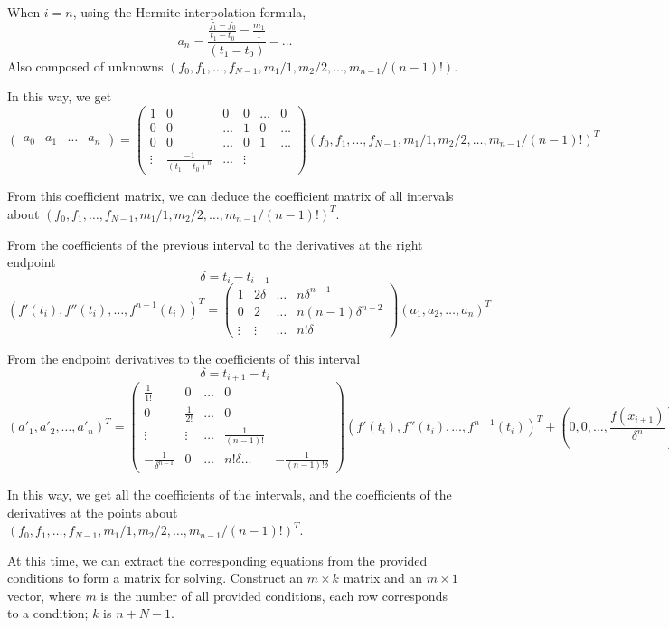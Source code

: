 \documentclass[a4paper]{article}
\begin{document}
When \(i = n\), using the Hermite interpolation formula,
\[
a_n = \frac{\frac{f_1 - f_0}{t_1 - t_0} - \frac{m_1}{1}}{(t_1 - t_0)} - \dots
\]
Also composed of unknowns \((f_0, f_1, \dots, f_{N-1}, m_1/1, m_2/2, \dots, m_{n-1}/(n-1)!)\).

In this way, we get
\[
\begin{pmatrix}
a_0 & a_1 & \dots & a_n
\end{pmatrix}
=
\begin{pmatrix}
1 & 0 & 0 & 0 & \dots & 0 \\
0 & 0 & \dots & 1 & 0 & \dots \\
0 & 0 & \dots & 0 & 1 & \dots \\
\vdots & \frac{-1}{(t_1 - t_0)^n} & \dots & \vdots
\end{pmatrix}
(f_0, f_1, \dots, f_{N-1}, m_1/1, m_2/2, \dots, m_{n-1}/(n-1)!)^T
\]

From this coefficient matrix, we can deduce the coefficient matrix of all intervals about \((f_0, f_1, \dots, f_{N-1}, m_1/1, m_2/2, \dots, m_{n-1}/(n-1)!)^T\).

From the coefficients of the previous interval to the derivatives at the right
endpoint
\[
\delta = t_i - t_{i-1}
\]
\[
(f'(t_i), f''(t_i), \dots, f^{n-1}(t_i))^T
=
\begin{pmatrix}
1 & 2\delta & \dots & n\delta^{n-1} \\
0 & 2 & \dots & n(n-1)\delta^{n-2} \\
\vdots & \vdots & \dots & n! \delta
\end{pmatrix}
(a_1, a_2, \dots, a_n)^T
\]

From the endpoint derivatives to the coefficients of this interval
\[
\delta = t_{i+1} - t_{i}
\]
\[
(a'_1, a'_2, \dots, a'_n)^T
=
\begin{pmatrix}
\frac{1}{1!} & 0 & \dots & 0 \\
0 & \frac{1}{2!} & \dots & 0 \\
\vdots & \vdots & \dots & \frac{1}{(n-1)!} \\
-\frac{1}{\delta^{n-1}} & 0 & \dots & n! \delta \dots & -\frac{1}{(n-1)! \delta}
\end{pmatrix}
(f'(t_i), f''(t_i), \dots, f^{n-1}(t_i))^T
+ (0, 0, \dots, \frac{f(x_{i+1})}{\delta^n})^T
\]

In this way, we get all the coefficients of the intervals, and the coefficients of the derivatives at the points about \((f_0, f_1, \dots, f_{N-1}, m_1/1, m_2/2, \dots, m_{n-1}/(n-1)!)^T\).

At this time, we can extract the corresponding equations from the provided conditions to form a matrix for solving. Construct an \(m \times k\) matrix and an \(m \times 1\) vector, where \(m\) is the number of all provided conditions, each row corresponds to a condition; \(k\) is \(n + N - 1\).
\end{document}
